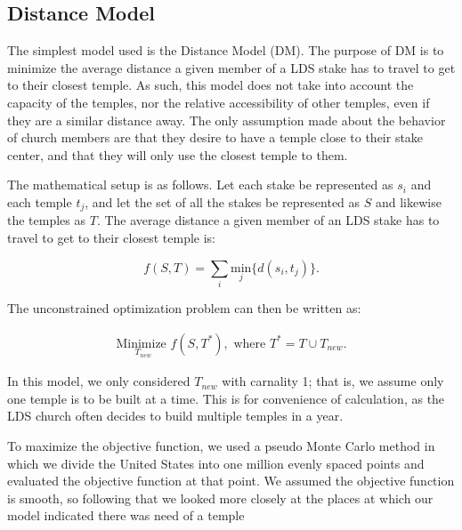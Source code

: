 \documentclass[twoside,twocolumn]{article}
\begin{document}
\subsection{Distance Model} 

The simplest model used is the Distance Model (DM).
The purpose of DM is to minimize the average distance a given member of a LDS stake has to travel to get to their closest temple.%
As such, this model does not take into account the capacity of the temples, nor the relative accessibility of other temples, even if they are a similar distance away. %
The only assumption made about the behavior of church members are that they desire to have a temple close to their stake center, and that they will only use the closest temple to them.

The mathematical setup is as follows. Let each stake be represented as $s_i$ and each temple $t_j$, and let the set of all the stakes be represented as $S$ and likewise the temples as $T$.
The average distance a given member of an LDS stake has to travel to get to their closest temple is:

\begin{equation}
	f(S,T) = \sum_i \underset{j}{\text{min}}\{d(s_i,t_j)\}.
\end{equation}

The unconstrained optimization problem can then be written as:

\begin{equation}
\begin{aligned}
	\underset{T_{new}}{\text{Minimize }} f(S,T^*), \text{ where } T^* = T \cup T_{new}.
\end{aligned}
\end{equation}

In this model, we only considered $T_{new}$ with carnality 1; that is, we assume only one temple is to be built at a time. 
This is for convenience of calculation, as the LDS church often decides to build multiple temples in a year. %

To maximize the objective function, we used a pseudo Monte Carlo method in which we divide the United States into one million evenly spaced points and evaluated the objective function at that point.
We assumed the objective function is smooth, so following that we looked more closely at the places at which our model indicated there was need of a temple %
\end{document}
